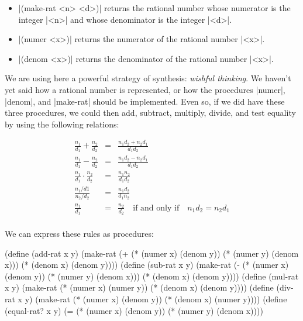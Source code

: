 \begin{itemize}
\item \scheme|(make-rat <n> <d>)| returns the rational number whose
  numerator is the integer \scheme|<n>| and whose denominator is the
  integer \scheme|<d>|.

\item \scheme|(numer <x>)| returns the numerator of the rational
  number \scheme|<x>|.

\item \scheme|(denom <x>)| returns the denominator of the rational
  number \scheme|<x>|.
\end{itemize}

We are using here a powerful strategy of synthesis: \textit{wishful thinking}.
We haven't yet said how a rational number is represented, or how the
procedures \scheme|numer|, \scheme|denom|, and \scheme|make-rat| should be
implemented.  Even so, if we did have these three procedures, we could
then add, subtract, multiply, divide, and test equality by using the
following relations:

\begin{eqnarray*}
  \frac{n_1}{d_1} + \frac{n_2}{d_2} & = & \frac{n_1d_2 + n_2d_1}{d_1d_2} \\
  \frac{n_1}{d_1} - \frac{n_2}{d_2} & = & \frac{n_1d_2 - n_2d_1}{d_1d_2} \\
  \frac{n_1}{d_1} \cdot \frac{n_2}{d_2} & = & \frac{n_1n_2}{d_1d_2} \\
  \frac{n_1/d1}{n_2/d_2} & = & \frac{n_1d_2}{d_1n_2} \\
  \frac{n_1}{d_1} & =& \frac{n_2}{d_2} \quad \text{if and only if} \quad n_1d_2 = n_2d_1 \\
\end{eqnarray*}

We can express these rules as procedures:

\begin{schemedisplay}
(define (add-rat x y)
  (make-rat (+ (* (numer x) (denom y))
               (* (numer y) (denom x)))
            (* (denom x) (denom y))))
(define (sub-rat x y)
  (make-rat (- (* (numer x) (denom y))
               (* (numer y) (denom x)))
            (* (denom x) (denom y))))
(define (mul-rat x y)
  (make-rat (* (numer x) (numer y))
            (* (denom x) (denom y))))
(define (div-rat x y)
  (make-rat (* (numer x) (denom y))
            (* (denom x) (numer y))))
(define (equal-rat? x y)
  (= (* (numer x) (denom y))
     (* (numer y) (denom x))))
\end{schemedisplay}

